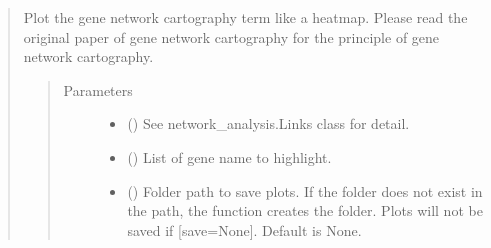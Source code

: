 \documentclass[letterpaper,10pt,english]{sphinxmanual}
\begin{document}
\begin{quote}
\begin{fulllineitems}
\begin{fulllineitems}
\end{fulllineitems}


\begin{fulllineitems}
\label{\detokenize{modules/celloracle.network_analysis:celloracle.network_analysis.Links.plot_cartography_term}}
Plot the gene network cartography term like a heatmap.
Please read the original paper of gene network cartography for the principle of gene network cartography.
\begin{quote}\begin{description}
\item[{Parameters}] \leavevmode\begin{itemize}
\item {} 
 ({\hyperref[\detokenize{modules/celloracle:celloracle.Links}]{}}) \textendash{} See network\_analysis.Links class for detail.

\item {} 
 () \textendash{} List of gene name to highlight.

\item {} 
 () \textendash{} Folder path to save plots. If the folder does not exist in the path, the function creates the folder.
Plots will not be saved if {[}save=None{]}. Default is None.

\end{itemize}

\end{description}\end{quote}

\end{fulllineitems}



\end{fulllineitems}
\end{quote}
\end{document}
